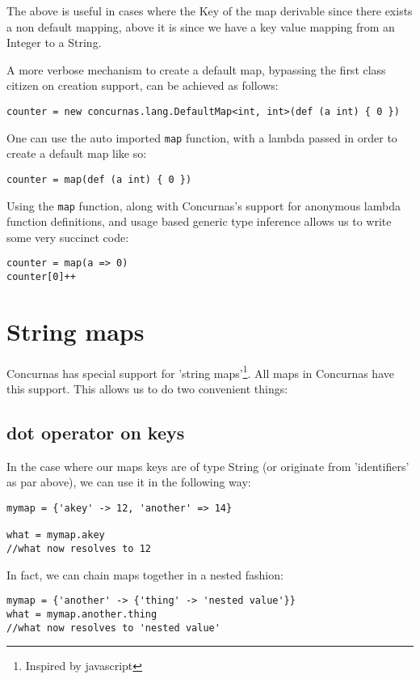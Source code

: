 \documentclass[conc-doc]{subfiles}
\begin{document}
The above is useful in cases where the Key of the map derivable since there exists a non default mapping, above it is since we have a key value mapping from an Integer to a String.

A more verbose mechanism to create a default map, bypassing the first class citizen on creation support, can be achieved as follows:

\begin{lstlisting}
counter = new concurnas.lang.DefaultMap<int, int>(def (a int) { 0 })
\end{lstlisting}

One can use the auto imported \lstinline{map} function, with a lambda passed in order to create a default map like so:

\begin{lstlisting}
counter = map(def (a int) { 0 })
\end{lstlisting}

Using the \lstinline{map} function, along with Concurnas's support for anonymous lambda function definitions, and usage based generic type inference allows us to write some very succinct code:

\begin{lstlisting}
counter = map(a => 0)
counter[0]++
\end{lstlisting}

\section{String maps}
Concurnas has special support for 'string maps'\footnote{Inspired by javascript}. All maps in Concurnas have this support. This allows us to do two convenient things:

\subsection{dot operator on keys}
In the case where our maps keys are of type String (or originate from 'identifiers' as par above), we can use it in the following way:

\begin{lstlisting}
mymap = {'akey' -> 12, 'another' => 14}

what = mymap.akey
//what now resolves to 12
\end{lstlisting}

In fact, we can chain maps together in a nested fashion:

\begin{lstlisting}
mymap = {'another' -> {'thing' -> 'nested value'}}
what = mymap.another.thing
//what now resolves to 'nested value'
\end{lstlisting}
\end{document}
